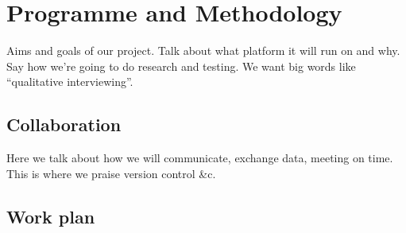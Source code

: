 \documentclass[10pt,a4paper,oneside]{report}
\begin{document}


\clearpage
\section*{Programme and Methodology}

Aims and goals of our project. Talk about what platform it will run on
and why. Say how we're going to do research and testing. We want big
words like ``qualitative interviewing''.

\subsection*{Collaboration}
Here we talk about how we will communicate, exchange data, meeting on
time. This is where we praise version control \&c.


\begin{landscape}
\begin{center}
\hspace*{-1.5in}
\vspace*{-1.5in}
\section*{Work plan}
\end{center}
\end{landscape}
\end{document}
